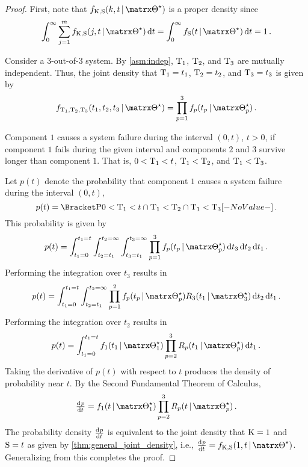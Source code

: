 \documentclass[../main.tex]{subfiles}
\begin{document}
\begin{proof}
First, note that $\pdf_{\RV{K}, \sv}(k, t \given \tparam\sysparam)$ is a proper density since
\begin{equation}
    \int_{0}^{\infty} \sum_{j=1}^{m} \pdf_{\RV{K}, \sv}(j, t \given \tparam\sysparam) \dif t = \int_{0}^{\infty} \spdf(t \given \tparam\sysparam) \dif t = 1\,.
\end{equation}

Consider a $3$-out-of-$3$ system. By \cref{asm:indep}, $\mathrm{T}_1$, $\mathrm{T}_2$, and $\mathrm{T}_3$ are mutually independent. Thus, the joint density that $\mathrm{T}_1 = t_1$, $\mathrm{T}_2 = t_2$, and $\mathrm{T}_3 = t_3$ is given by
\begin{equation}
    \pdf_{\cv_1, \cv_2, \cv_3}(t_1, t_2, t_3 \given \tparam\sysparam) =
        \prod_{p=1}^{3} \pdf_p(t_p \given \tparam{\sysparam}_p)\,.
\end{equation}

Component $1$ causes a system failure during the interval $(0, t)$, $t > 0$, if component $1$ fails during the given interval and components $2$ and $3$ survive longer than component $1$. That is, $0 < \mathrm{T}_1 < t$, $\mathrm{T}_1 < \mathrm{T}_2$, and $\mathrm{T}_1 < \mathrm{T}_3$.

Let $p(t)$ denote the probability that component $1$ causes a system failure during the interval $(0, t)$,
\begin{equation}
    p(t) = \Prob{0 < \cv_1 < t \cap \cv_1 < \cv_2 \cap \cv_1 < \cv_3}\,.
\end{equation}
This probability is given by
\begin{equation}
    p(t) = \int_{t_1=0}^{t_1=t} \int_{t_2=t_1}^{t_2=\infty} \int_{t_3=t_1}^{t_3=\infty}
    \prod_{p=1}^{3} \pdf_p(t_p \given \tparam{\sysparam}_p) \dif t_3 \dif t_2 \dif t_1\,.
\end{equation}
Performing the integration over $t_3$ results in
\begin{equation}
    p(t) = \int_{t_1=0}^{t_1=t} \int_{t_2=t_1}^{t_2=\infty}
    \prod_{p=1}^{2} \pdf_p(t_p \given \tparam{\sysparam}_p)
    \srv_3(t_1 \given \tparam{\sysparam}_3) \dif t_2 \dif t_1\,.
\end{equation}
Performing the integration over $t_2$ results in
\begin{equation}
    p(t) = \int_{t_1=0}^{t_1=t} \pdf_1(t_1 \given \tparam{\sysparam}_1)
    \prod_{p=2}^{3} \srv_p(t_1 \given \tparam{\sysparam}_p) \dif t_1\,.
\end{equation}
Taking the derivative of $p(t)$ with respect to $t$ produces the density of probability near $t$. By the Second Fundamental Theorem of Calculus,
\begin{equation}
    \od{p}{t} = \pdf_1(t \given \tparam{\sysparam}_1) \prod_{p=2}^{3} \srv_p(t \given \tparam{\sysparam}_p)\,.
\end{equation}
The probability density $\od{p}{t}$ is equivalent to the joint density that $\mathrm{K} = 1$ and $\mathrm{S} = t$ as given by \cref{thm:general_joint_density}, i.e., $\od{p}{t} = \pdf_{\RV{K}, \sv}(1, t \given \tparam{\sysparam})$. Generalizing from this completes the proof.
\end{proof}
\end{document}
